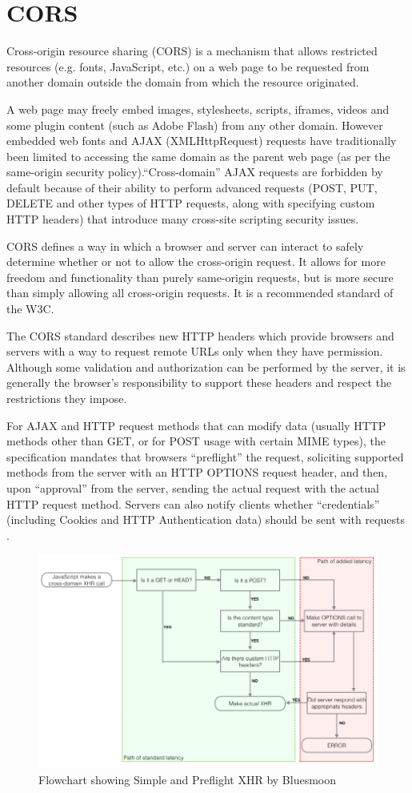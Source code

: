 \section{CORS}
\label{subsec:S3_cors}

Cross-origin resource sharing (CORS) is a mechanism that allows restricted resources (e.g. fonts, JavaScript, etc.) on a web page to be requested from another domain outside the domain from which the resource originated.

A web page may freely embed images, stylesheets, scripts, iframes, videos and some plugin content (such as Adobe Flash) from any other domain. However embedded web fonts and AJAX (XMLHttpRequest) requests have traditionally been limited to accessing the same domain as the parent web page (as per the same-origin security policy).``Cross-domain'' AJAX requests are forbidden by default because of their ability to perform advanced requests (POST, PUT, DELETE and other types of HTTP requests, along with specifying custom HTTP headers) that introduce many cross-site scripting security issues.

CORS defines a way in which a browser and server can interact to safely determine whether or not to allow the cross-origin request. It allows for more freedom and functionality than purely same-origin requests, but is more secure than simply allowing all cross-origin requests. It is a recommended standard of the W3C.

The CORS standard describes new HTTP headers which provide browsers and servers with a way to request remote URLs only when they have permission. Although some validation and authorization can be performed by the server, it is generally the browser's responsibility to support these headers and respect the restrictions they impose.

For AJAX and HTTP request methods that can modify data (usually HTTP methods other than GET, or for POST usage with certain MIME types), the specification mandates that browsers ``preflight'' the request, soliciting supported methods from the server with an HTTP OPTIONS request header, and then, upon ``approval'' from the server, sending the actual request with the actual HTTP request method. Servers can also notify clients whether ``credentials'' (including Cookies and HTTP Authentication data) should be sent with requests \cite{s3_cors}. 

\begin {figure}[h]
\graphicspath{{images/chapter_s3/}}
\includegraphics[width=\textwidth]{cors}
\caption{Flowchart showing Simple and Preflight XHR by Bluesmoon}
\end {figure}

